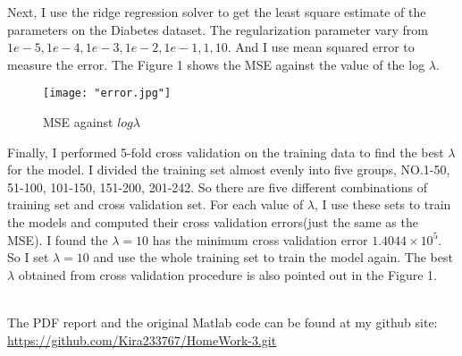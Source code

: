 \documentclass[letterpaper,12pt]{article}
\begin{document}
Next, I use the ridge regression solver to get the least square estimate of the parameters on the Diabetes dataset. The regularization parameter vary from $1e-5, 1e-4, 1e-3, 1e-2, 1e-1, 1, 10$. And I use mean squared error to measure the error. The Figure 1 shows the MSE against the value of the log $\lambda$.
\begin{center}
\begin{figure}
\texttt{[image: "error.jpg"]}
\caption{MSE against $log \lambda$}
\end{figure}
\end{center}
Finally, I performed 5-fold cross validation on the training data to find the best $\lambda$ for the model. I divided the training set almost evenly into five groups, NO.1-50, 51-100, 101-150, 151-200, 201-242. So there are five different combinations of training set and cross validation set. For each value of $\lambda$, I use these sets to train the models and computed their cross validation errors(just the same as the MSE). I found the $\lambda = 10$ has the minimum cross validation error $1.4044 \times 10 ^{5}$. So I set $\lambda = 10$ and use the whole training set to train the model again. The best $\lambda$ obtained from cross validation procedure is also pointed out in the Figure 1.

\quad \\


The PDF report and the original Matlab code can be found at my github site:   
\url{https://github.com/Kira233767/HomeWork-3.git}
\end{document}
